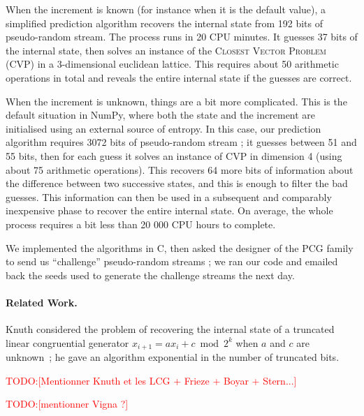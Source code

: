 \documentclass[submission,svgnames,journal=tosc]{iacrtrans}
\newcommand{\todo}[1]{\textcolor{red}{TODO:[#1]}}
\begin{document}
When the increment is known (for instance when it is the default value), a
simplified prediction algorithm recovers the internal state from 192 bits of
pseudo-random stream. The process runs in 20 CPU minutes. It guesses 37 bits of
the internal state, then solves an instance of the \textsc{Closest Vector
  Problem} (CVP) in a 3-dimensional euclidean lattice. This requires about 50
arithmetic operations in total and reveals the entire internal state if the
guesses are correct.

When the increment is unknown, things are a bit more complicated. This is the
default situation in \textsf{NumPy}, where both the state and the increment are
initialised using an external source of entropy. In this case, our prediction
algorithm requires 3072 bits of pseudo-random stream ; it guesses between 51 and
55 bits, then for each guess it solves an instance of CVP in dimension 4 (using
about 75 arithmetic operations). This recovers 64 more bits of information about
the difference between two successive states, and this is enough to filter the
bad guesses. This information can then be used in a subsequent and comparably
inexpensive phase to recover the entire internal state. On average, the whole
process requires a bit less than 20 000 CPU hours to complete.

We implemented the algorithms in \textsf{C}, then asked the designer of the PCG
family to send us ``challenge'' pseudo-random streams ; we ran our code and
emailed back the seeds used to generate the challenge streams the next day.

\paragraph{Related Work.} Knuth considered the problem of recovering the
internal state of a truncated linear congruential generator
$x_{i+1} = ax_i + c \bmod 2^k$ when $a$ and $c$ are unknown~\cite{Knuth85}; he
gave an algorithm exponential in the number of truncated bits.


\todo{Mentionner Knuth et les LCG + Frieze + Boyar + Stern...}

\todo{mentionner Vigna ?}

\end{document}
